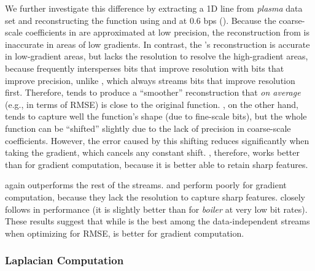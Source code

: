 We further investigate this difference by extracting a 1D line from \emph{plasma} data set and
reconstructing the function using \sbit and \swav at 0.6 bps
(). Because the coarse-scale coefficients in \sbit are
approximated at low precision, the reconstruction from \sbit is inaccurate in areas of low
gradients. In contrast, the \swav's reconstruction is accurate in low-gradient areas, but lacks the
resolution to resolve the high-gradient areas, because \swav frequently intersperses bits that
improve resolution with bits that improve precision, unlike \sbit, which always streams bits that
improve resolution first. Therefore, \swav tends to produce a ``smoother'' reconstruction that
\emph{on average} (e.g., in terms of RMSE) is close to the original function. \sbit, on the other
hand, tends to capture well the function's shape (due to fine-scale bits), but the whole function
can be ``shifted'' slightly due to the lack of precision in coarse-scale coefficients. However, the
error caused by this shifting reduces significantly when taking the gradient, which cancels any
constant shift. \sbit, therefore, works better than \swav for gradient computation, because it is
better able to retain sharp features.

\sgop again outperforms the rest of the streams. \slvl and \smag perform poorly for gradient
computation, because they lack the resolution to capture sharp features. \sgsg closely follows \sbit
in performance (it is slightly better than \sbit for \emph{boiler} at very low bit rates). These
results suggest that while \swav is the best among the data-independent streams when optimizing for
RMSE, \sbit is better for gradient computation.

\subsubsection{Laplacian Computation}\label{sec:laplacian}


